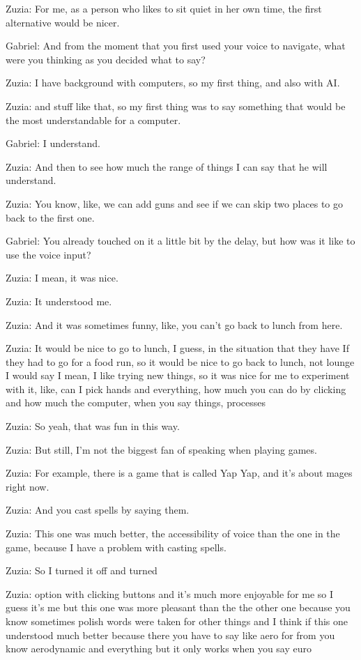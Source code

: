 Zuzia: For me, as a person who likes to sit quiet in her own time, the first alternative would be nicer.

Gabriel: And from the moment that you first used your voice to navigate, what were you thinking as you decided what to say?

Zuzia: I have background with computers, so my first thing, and also with AI.

Zuzia: and stuff like that, so my first thing was to say something that would be the most understandable for a computer.

Gabriel: I understand.

Zuzia: And then to see how much the range of things I can say that he will understand.

Zuzia: You know, like, we can add guns and see if we can skip two places to go back to the first one.

Gabriel: You already touched on it a little bit by the delay, but how was it like to use the voice input?

Zuzia: I mean, it was nice.

Zuzia: It understood me.

Zuzia: And it was sometimes funny, like, you can't go back to lunch from here.

Zuzia: It would be nice to go to lunch, I guess, in the situation that they have If they had to go for a food run, so it would be nice to go back to lunch, not lounge I would say I mean, I like trying new things, so it was nice for me to experiment with it, like, can I pick hands and everything, how much you can do by clicking and how much the computer, when you say things, processes

Zuzia: So yeah, that was fun in this way.

Zuzia: But still, I'm not the biggest fan of speaking when playing games.

Zuzia: For example, there is a game that is called Yap Yap, and it's about mages right now.

Zuzia: And you cast spells by saying them.

Zuzia: This one was much better, the accessibility of voice than the one in the game, because I have a problem with casting spells.

Zuzia: So I turned it off and turned

Zuzia: option with clicking buttons and it's much more enjoyable for me so I guess it's me but this one was more pleasant than the the other one because you know sometimes polish words were taken for other things and I think if this one understood much better because there you have to say like aero for from you know aerodynamic and everything but it only works when you say euro


